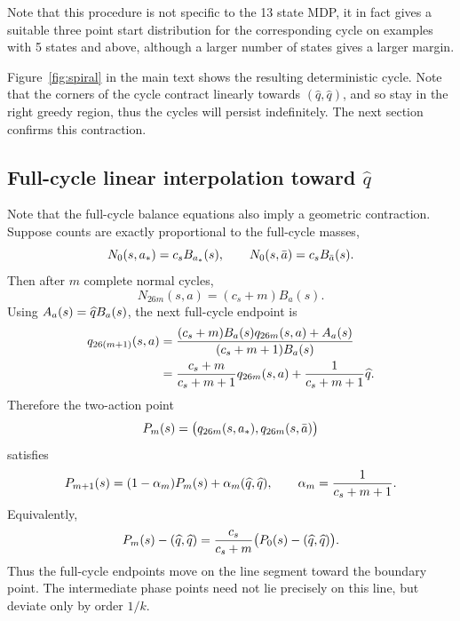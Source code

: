 Note that this procedure is not specific to the 13 state MDP, it in fact gives a suitable three point start distribution for the corresponding cycle on examples with 5 states and above, although a larger number of states gives a larger margin.

Figure~\ref{fig:spiral} in the main text shows the resulting
deterministic cycle. Note that the corners of the cycle contract
linearly towards $(\widehat q,\widehat q)$, and so stay in the right greedy region, thus the cycles will persist indefinitely. The next section confirms this contraction.
 

\subsection{Full-cycle linear interpolation toward $\widehat q$}
\label{sec:linear-interpolation}

Note that the full-cycle balance equations also imply a geometric contraction.  Suppose counts are exactly proportional to the full-cycle masses,
\begin{equation*}
    N_0(s,a_*)=c_sB_{a_*}(s),
    \qquad
    N_0(s,\bar a)=c_sB_{\bar a}(s).
\end{equation*}
Then after $m$ complete normal cycles,
\begin{equation*}
    N_{26m}(s,a)=(c_s+m)B_a(s).
\end{equation*}
Using $A_a(s)=\widehat q B_a(s)$, the next full-cycle endpoint is
\begin{align}
q_{26(m+1)}(s,a)
&={ (c_s+m)B_a(s)q_{26m}(s,a)+A_a(s) \over (c_s+m+1)B_a(s)}\\
&={c_s+m\over c_s+m+1}q_{26m}(s,a)+{1\over c_s+m+1}\widehat q.
\end{align}
Therefore the two-action point
\begin{equation*}
    P_m(s)=\bigl(q_{26m}(s,a_*),q_{26m}(s,\bar a)\bigr)
\end{equation*}
satisfies
\begin{equation}
    P_{m+1}(s)=(1-\alpha_m)P_m(s)+\alpha_m(\widehat q,\widehat q),
    \qquad
    \alpha_m={1\over c_s+m+1}.
\label{eq:linear-interpolation}
\end{equation}
Equivalently,
\begin{equation*}
    P_m(s)-(\widehat q,\widehat q)=
    {c_s\over c_s+m}\bigl(P_0(s)-(\widehat q,\widehat q)\bigr).
\end{equation*}
Thus the full-cycle endpoints move on the line segment toward the boundary point. The intermediate phase points need not lie precisely on this line, but deviate only by order $1/k$.
